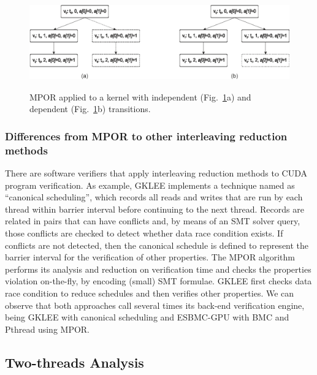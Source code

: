 \documentclass[times, doublespace]{cpeauth}
\begin{document}
\begin{figure}[h]
\lstset{basicstyle=\scriptsize}
\center
\includegraphics[width=14cm, height=4.0cm]{images/eps/Pereira_10_mpor.eps}
\caption{MPOR applied to a kernel with independent (Fig.~\ref{fig:kernelMpor}a) and dependent (Fig.~\ref{fig:kernelMpor}b) transitions.}
\label{fig:kernelMpor}
\end{figure}

\subsubsection{Differences from MPOR to other interleaving reduction methods}
\label{sec:Differencesfro MPOR}

There are software verifiers that apply interleaving reduction methods to CUDA program verification. As example, GKLEE implements a technique named as ``canonical scheduling'', which records all reads and writes that are run by each thread within barrier interval before continuing to the next thread. Records are related in pairs that can have conflicts and, by means of an SMT solver query, those conflicts are checked to detect whether data race condition exists. If conflicts are not detected, then the canonical schedule is defined to represent the barrier interval for the verification of other properties. The MPOR algorithm performs its analysis and reduction on verification time and checks the properties violation on-the-fly, by encoding (small) SMT formulae. GKLEE first checks data race condition to reduce schedules and then verifies other properties. We can observe that both approaches call several times its back-end verification engine, being GKLEE with canonical scheduling and ESBMC-GPU with BMC and Pthread using MPOR.

\subsection{Two-threads Analysis}
\vspace{-2pt}
\label{sec:twothreadsReduction}
\end{document}
